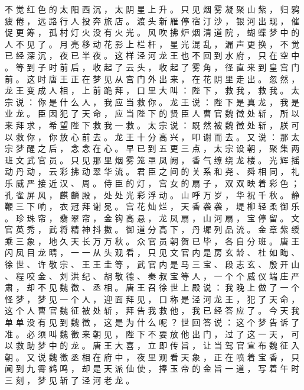 {不 觉 红 色 的 太 阳 西 沉 ， 太 阴 星 上 升 。
只 见 烟 雾 凝 聚 山 紫 ， 归 鸦 疲 倦 ， 远 路 行 人 投 奔 旅 店 。
渡 头 新 雁 停 宿 汀 沙 ， 银 河 出 现 ， 催 促 更 筹 ， 孤 村 灯 火 没 有 火 光 。
风 吹 拂 炉 烟 清 道 院 ， 蝴 蝶 梦 中 的 人 不 见 了 。
月 亮 移 动 花 影 上 栏 杆 ， 星 光 混 乱 ， 漏 声 更 换 ， 不 觉 已 经 深 沉 ， 夜 已 半 夜 。
这 样 泾 河 龙 王 也 不 回 到 水 府 ， 只 在 空 中 。
等 到 子 时 前 后 ， 收 起 了 云 头 ， 收 起 了 雾 角 ， 径 直 来 到 皇 宫 门 前 。
这 时 唐 王 正 在 梦 见 从 宫 门 外 出 来 ， 在 花 阴 里 走 出 。
忽 然 ， 龙 王 变 成 人 相 ， 上 前 跪 拜 ， 口 里 大 叫 ： 陛 下 ， 救 我 ， 救 我 。
太 宗 说 ： 你 是 什 么 人 ， 我 应 当 救 你 。
龙 王 说 ： 陛 下 是 真 龙 ， 我 是 业 龙 。
臣 因 犯 了 天 命 ， 应 当 陛 下 的 贤 臣 人 曹 官 魏 徵 处 斩 ， 所 以 来 拜 求 ， 希 望 陛 下 救 我 一 救 。
太 宗 说 ： 既 然 被 魏 徵 处 斩 ， 朕 可 以 救 你 ， 你 放 心 前 去 。
龙 王 十 分 高 兴 ， 叩 谢 而 去 。
又 说 ： 那 太 宗 梦 醒 之 后 ， 念 念 在 心 。
早 已 到 五 更 三 点 ， 太 宗 设 朝 ， 聚 集 两 班 文 武 官 员 。
只 见 那 里 烟 雾 笼 罩 凤 阙 ， 香 气 缭 绕 龙 楼 。
光 辉 摇 动 丹 动 ， 云 彩 拂 动 翠 华 流 。
君 臣 之 间 的 关 系 和 尧 、 舜 相 同 ， 礼 乐 威 严 接 近 汉 、 周 。
侍 臣 的 灯 ， 宫 女 的 扇 子 ， 双 双 映 着 彩 色 ； 孔 雀 屏 风 ， 麒 麟 殿 ， 处 处 光 彩 浮 动 。
山 呼 万 岁 ， 华 祝 千 秋 。
静 鞭 三 下 响 ， 衣 冠 拜 谢 冕 。
宫 花 灿 烂 ， 天 香 袭 袭 ， 堤 柳 轻 柔 御 乐 。
珍 珠 帘 ， 翡 翠 帘 ， 金 钩 高 悬 ， 龙 凤 扇 ， 山 河 扇 ， 宝 停 留 。
文 官 英 秀 ， 武 将 精 神 抖 擞 。
御 道 分 高 下 ， 丹 墀 列 品 流 。
金 章 紫 绶 乘 三 象 ， 地 久 天 长 万 万 秋 。
众 官 员 朝 贺 已 毕 ， 各 自 分 班 。
唐 王 闪 凤 目 龙 睛 ， 一 一 从 头 观 看 ， 只 见 文 官 内 是 房 玄 龄 、 杜 如 晦 、 徐 世 、 许 敬 宗 、 王 王 圭 等 ， 武 官 内 是 马 三 宝 、 段 志 玄 、 殷 开 山 、 程 咬 金 、 刘 洪 纪 、 胡 敬 德 、 秦 叔 宝 等 人 ， 一 个 个 威 仪 端 庄 严 肃 ， 却 不 见 魏 徵 、 丞 相 。
唐 王 召 徐 世 上 殿 说 ： 我 晚 上 做 了 一 个 怪 梦 ， 梦 见 一 个 人 ， 迎 面 拜 见 ， 口 称 是 泾 河 龙 王 ， 犯 了 天 命 ， 这 个 人 曹 官 魏 征 被 处 斩 ， 拜 告 我 救 他 ， 我 已 经 答 应 了 。
今 天 我 单 单 没 有 见 到 魏 徵 ， 这 是 为 什 么 呢 ？ 世 回 答 说 ： 这 个 梦 告 诉 了 准 。
必 须 叫 魏 徵 来 朝 见 ， 陛 下 不 要 放 他 出 门 ， 过 了 这 一 天 ， 可 以 救 助 梦 中 的 龙 。
唐 王 大 喜 ， 立 即 传 旨 ， 让 当 驾 官 宣 布 魏 征 入 朝 。
又 说 魏 徵 丞 相 在 府 中 ， 夜 里 观 看 天 象 ， 正 在 喷 着 宝 香 ， 只 闻 到 九 霄 鹤 鸣 ， 却 是 天 派 仙 使 ， 捧 玉 帝 的 金 旨 一 道 ， 写 着 午 时 三 刻 ， 梦 见 斩 了 泾 河 老 龙 。
}
